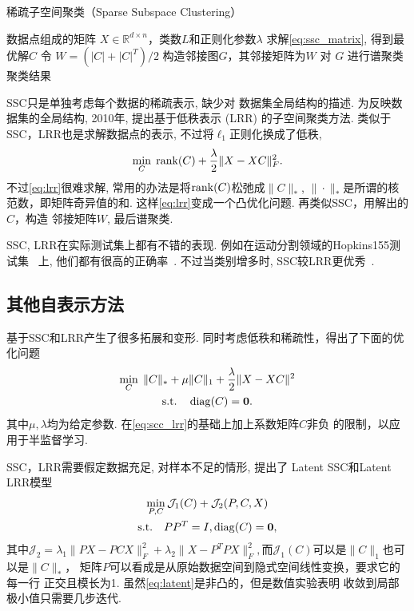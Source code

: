 \begin{algorithm}[tb]
  \caption{稀疏子空间聚类（Sparse Subspace Clustering）}
  \label{alg:ssc}
  \begin{algorithmic}
    数据点组成的矩阵 \(X\in \mathbb{R}^{d\times
    n}\)，类数\(L\)和正则化参数\(\lambda\)
     求解\eqref{eq:ssc_matrix}, 得到最优解\(C\)
     令 \(W=(|C|+|C|^T)/2\) 构造邻接图\(G\)，其邻接矩阵为\(W\)
     对 \(G\) 进行谱聚类 
     聚类结果
  \end{algorithmic}
\end{algorithm}

SSC只是单独考虑每个数据的稀疏表示, 缺少对
数据集全局结构的描述. 为反映数据集的全局结构,
2010年, \cite{liu2010robust} 提出基于低秩表示 (LRR)
的子空间聚类方法. 类似于SSC，LRR也是求解数据点的表示,
不过将\(\ell_1\)正则化换成了低秩,
\begin{equation}
  \min_{C} \; \operatorname{rank}(C)+\frac{\lambda}{2}\|X-XC\|_F^2. \label{eq:lrr}
\end{equation}
不过\eqref{eq:lrr}很难求解, 常用的办法是将\(\operatorname{rank}(C)\)松弛成\(\|C\|_*\),
\(\|\cdot\|_*\)是所谓的核范数，即矩阵奇异值的和.
这样\eqref{eq:lrr}变成一个凸优化问题. 再类似SSC，用解出的\(C\)，构造
邻接矩阵\(W\), 最后谱聚类.

SSC, LRR在实际测试集上都有不错的表现. 例如在运动分割领域的Hopkins155测试集~
\cite{tron2007benchmark}上,
他们都有很高的正确率~\cite{elhamifar2013sparse, liu2013robust}.
不过当类别增多时, SSC较LRR更优秀~\cite{elhamifar2013sparse}.

\subsection{其他自表示方法}
基于SSC和LRR产生了很多拓展和变形.
\cite{wang2013provable}同时考虑低秩和稀疏性，得出了下面的优化问题
\begin{equation}\label{eq:scc_lrr}
  \begin{gathered}
    \min_{C} \; \|C\|_*+\mu \|C\|_1+\frac{\lambda}{2}\|X-XC\|^2 \\
    \text{s.t.}\quad \operatorname{diag}(C) = \mathbf{0}.
  \end{gathered}
\end{equation}
其中\(\mu,\lambda\)均为给定参数. 
\cite{zhuang2012non}在\eqref{eq:scc_lrr}的基础上加上系数矩阵\(C\)非负
的限制，以应用于半监督学习.

SSC，LRR需要假定数据充足, 对样本不足的情形, \cite{patel2015latent}
提出了 Latent SSC和Latent LRR模型
\begin{equation}
  \begin{gathered}
    \min_{P,C} \mathcal{J}_1(C)+\mathcal{J}_2(P, C, X) \\
    \text{s.t.}\quad PP^T=I, \operatorname{diag}(C)=\mathbf{0},
  \end{gathered}
  \label{eq:latent}
\end{equation}
其中\(\mathcal{J}_2=\lambda_1\|PX-PCX\|_F^2+\lambda_2\|X-P^TP
X\|_F^2,\)而\(\mathcal{J}_1(C)\)可以是\(\|C\|_1\)也可以是\(\|C\|_*\)，
矩阵\(P\)可以看成是从原始数据空间到隐式空间线性变换，要求它的每一行
正交且模长为1. 虽然\eqref{eq:latent}是非凸的，但是数值实验表明
收敛到局部极小值只需要几步迭代.

